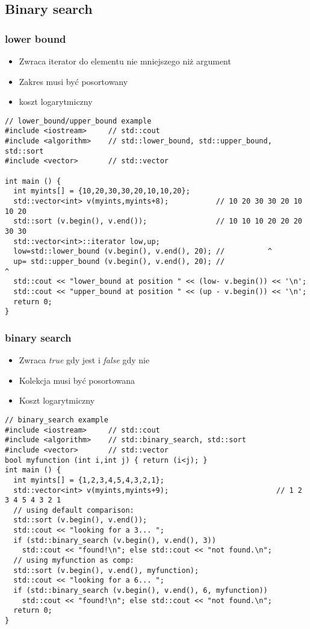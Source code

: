 \documentclass[10pt]{beamer}
\begin{document}
\subsection{Binary search}

\begin{frame}[fragile]
  \frametitle{lower bound}
  \begin{itemize} 
    \item Zwraca iterator do elementu nie mniejszego niż argument
    \item Zakres musi być posortowany
    \item koszt logarytmiczny
  \end{itemize}
  \begin{lstlisting}
// lower_bound/upper_bound example
#include <iostream>     // std::cout
#include <algorithm>    // std::lower_bound, std::upper_bound, std::sort
#include <vector>       // std::vector

int main () {
  int myints[] = {10,20,30,30,20,10,10,20};
  std::vector<int> v(myints,myints+8);           // 10 20 30 30 20 10 10 20
  std::sort (v.begin(), v.end());                // 10 10 10 20 20 20 30 30
  std::vector<int>::iterator low,up;
  low=std::lower_bound (v.begin(), v.end(), 20); //          ^
  up= std::upper_bound (v.begin(), v.end(), 20); //                   ^
  std::cout << "lower_bound at position " << (low- v.begin()) << '\n';
  std::cout << "upper_bound at position " << (up - v.begin()) << '\n';
  return 0;
}
  \end{lstlisting}
\end{frame}

\begin{frame}[fragile]
  \frametitle{binary search}
  \begin{itemize} 
    \item Zwraca \textit{true} gdy jest i \textit{false} gdy nie
    \item Kolekcja musi być posortowana
    \item Koszt logarytmiczny
  \end{itemize}
  \begin{lstlisting}
// binary_search example
#include <iostream>     // std::cout
#include <algorithm>    // std::binary_search, std::sort
#include <vector>       // std::vector
bool myfunction (int i,int j) { return (i<j); }
int main () {
  int myints[] = {1,2,3,4,5,4,3,2,1};
  std::vector<int> v(myints,myints+9);                         // 1 2 3 4 5 4 3 2 1
  // using default comparison:
  std::sort (v.begin(), v.end());
  std::cout << "looking for a 3... ";
  if (std::binary_search (v.begin(), v.end(), 3))
    std::cout << "found!\n"; else std::cout << "not found.\n";
  // using myfunction as comp:
  std::sort (v.begin(), v.end(), myfunction);
  std::cout << "looking for a 6... ";
  if (std::binary_search (v.begin(), v.end(), 6, myfunction))
    std::cout << "found!\n"; else std::cout << "not found.\n";
  return 0;
}
  \end{lstlisting}
\end{frame}
\end{document}

